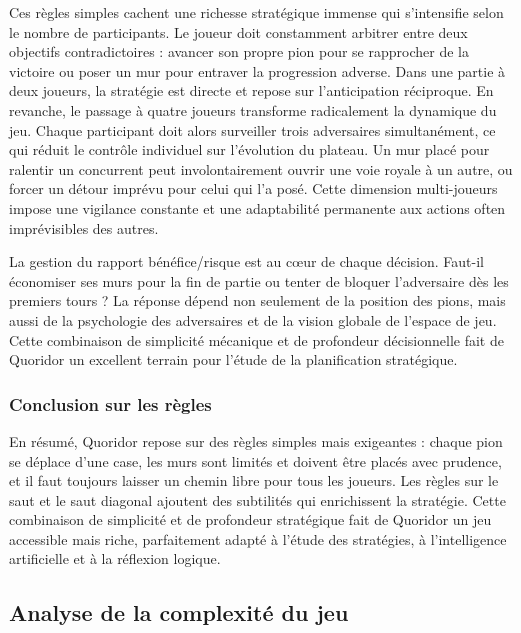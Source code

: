 \documentclass[a4paper]{article}
\begin{document}
Ces règles simples cachent une richesse stratégique immense qui s'intensifie selon le nombre de participants. Le joueur doit constamment arbitrer entre deux objectifs contradictoires : avancer son propre pion pour se rapprocher de la victoire ou poser un mur pour entraver la progression adverse. Dans une partie à deux joueurs, la stratégie est directe et repose sur l'anticipation réciproque. En revanche, le passage à quatre joueurs transforme radicalement la dynamique du jeu. Chaque participant doit alors surveiller trois adversaires simultanément, ce qui réduit le contrôle individuel sur l'évolution du plateau. Un mur placé pour ralentir un concurrent peut involontairement ouvrir une voie royale à un autre, ou forcer un détour imprévu pour celui qui l'a posé. Cette dimension multi-joueurs impose une vigilance constante et une adaptabilité permanente aux actions often imprévisibles des autres.

La gestion du rapport bénéfice/risque est au cœur de chaque décision. Faut-il économiser ses murs pour la fin de partie ou tenter de bloquer l'adversaire dès les premiers tours ? La réponse dépend non seulement de la position des pions, mais aussi de la psychologie des adversaires et de la vision globale de l'espace de jeu. Cette combinaison de simplicité mécanique et de profondeur décisionnelle fait de Quoridor un excellent terrain pour l'étude de la planification stratégique.

\subsubsection{Conclusion sur les règles}

En résumé, Quoridor repose sur des règles simples mais exigeantes : chaque pion se déplace d'une case, les murs sont limités et doivent être placés avec prudence, et il faut toujours laisser un chemin libre pour tous les joueurs. Les règles sur le saut et le saut diagonal ajoutent des subtilités qui enrichissent la stratégie. Cette combinaison de simplicité et de profondeur stratégique fait de Quoridor un jeu accessible mais riche, parfaitement adapté à l'étude des stratégies, à l'intelligence artificielle et à la réflexion logique.

\subsection{Analyse de la complexité du jeu}
\end{document}
